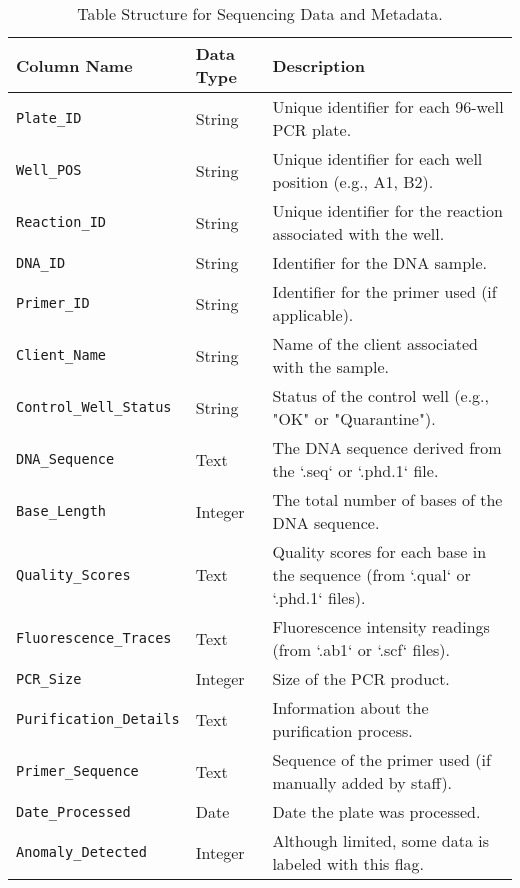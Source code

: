 \begin{table}[H]
  \centering
  \begin{tabular}{|l|l|p{8cm}|}
    \hline
    \textbf{Column Name} & \textbf{Data Type} & \textbf{Description} \\ \hline
    \texttt{Plate\_ID} & String & Unique identifier for each 96-well PCR plate. \\ \hline
    \texttt{Well\_POS} & String & Unique identifier for each well position (e.g., A1, B2). \\ \hline
    \texttt{Reaction\_ID} & String & Unique identifier for the reaction associated with the well. \\ \hline
    \texttt{DNA\_ID} & String & Identifier for the DNA sample. \\ \hline
    \texttt{Primer\_ID} & String & Identifier for the primer used (if applicable). \\ \hline
    \texttt{Client\_Name} & String & Name of the client associated with the sample. \\ \hline
    \texttt{Control\_Well\_Status} & String & Status of the control well (e.g., "OK" or "Quarantine"). \\ \hline
    \texttt{DNA\_Sequence} & Text & The DNA sequence derived from the `.seq` or `.phd.1` file. \\ \hline
    \texttt{Base\_Length} & Integer & The total number of bases of the DNA sequence. \\ \hline
    \texttt{Quality\_Scores} & Text & Quality scores for each base in the sequence (from `.qual` or `.phd.1` files). \\ \hline
    \texttt{Fluorescence\_Traces} & Text & Fluorescence intensity readings (from `.ab1` or `.scf` files). \\ \hline
    \texttt{PCR\_Size} & Integer & Size of the PCR product. \\ \hline
    \texttt{Purification\_Details} & Text & Information about the purification process. \\ \hline
    \texttt{Primer\_Sequence} & Text & Sequence of the primer used (if manually added by staff). \\ \hline
    \texttt{Date\_Processed} & Date & Date the plate was processed. \\ \hline
    \texttt{Anomaly\_Detected} & Integer & Although limited, some data is labeled with this flag. \\ \hline
  \end{tabular}
  \caption{Table Structure for Sequencing Data and Metadata.}
  \label{tab:unified_table}
\end{table}

